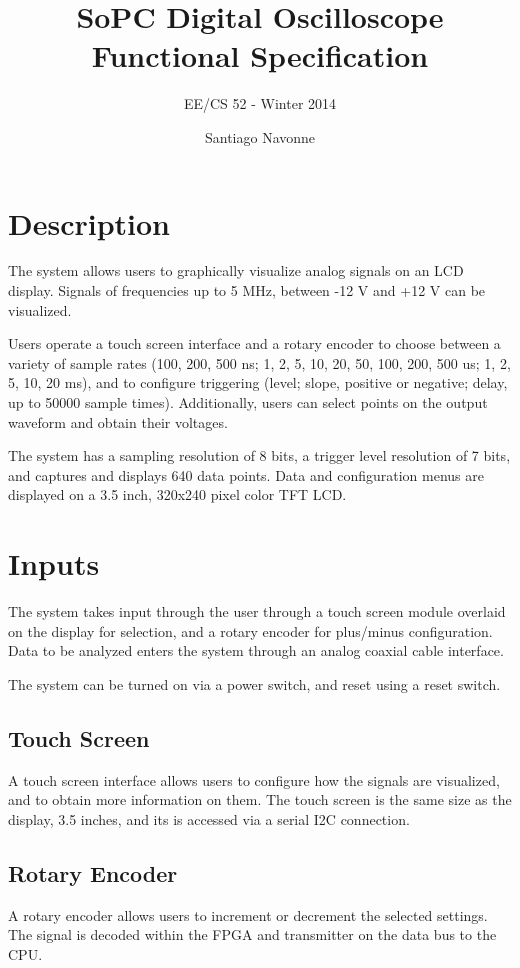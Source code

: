\documentclass{scrartcl}
\begin{document}

	\title{SoPC Digital Oscilloscope Functional Specification}
	\subtitle{EE/CS 52 - Winter 2014}
	\author{Santiago Navonne} 
	\date{} 
	\maketitle
	
	\section*{Description}
	The system allows users to graphically visualize analog signals on an LCD display. Signals of frequencies up to 5 MHz, between -12 V and +12 V can be visualized.

	Users operate a touch screen interface and a rotary encoder to choose between a variety of sample rates (100, 200, 500 ns; 1, 2, 5, 10, 20, 50, 100, 200, 500 us; 1, 2, 5, 10, 20 ms), and to configure triggering (level; slope, positive or negative; delay, up to 50000 sample times). Additionally, users can select points on the output waveform and obtain their voltages.

	The system has a sampling resolution of 8 bits, a trigger level resolution of 7 bits, and captures and displays 640 data points. Data and configuration menus are displayed on a 3.5 inch, 320x240 pixel color TFT LCD.
	
	\section*{Inputs}
	The system takes input through the user through a touch screen module overlaid on the display for selection, and a rotary encoder for plus/minus configuration. Data to be analyzed enters the system through an analog coaxial cable interface.

	The system can be turned on via a power switch, and reset using a reset switch.
	
	\subsection*{Touch Screen}
	A touch screen interface allows users to configure how the signals are visualized, and to obtain more information on them.
	The touch screen is the same size as the display, 3.5 inches, and its is accessed via a serial I2C connection.
	
	\subsection*{Rotary Encoder}
	A rotary encoder allows users to increment or decrement the selected settings. The signal is decoded within the FPGA and transmitter on the data bus to the CPU.
\end{document}
